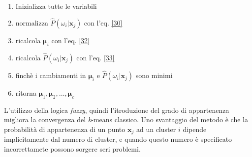 \begin{enumerate}
\item Inizializza tutte le variabili
\item normalizza $\hat{P}(\omega_i | \mathbf{x}_j)$ con l'eq. \ref{30}
\item ricalcola $\mathbf{\mu}_i$ con l'eq. \ref{32}
\item ricalcola $\hat{P}(\omega_i | \mathbf{x}_j)$ con l'eq. \ref{33}
\item finchè i cambiamenti in $\mathbf{\mu}_i$ e $\hat{P}(\omega_i | \mathbf{x}_j)$ sono minimi
\item ritorna $\mathbf{\mu}_1, \mathbf{\mu}_2, \dots, \mathbf{\mu}_c$
\end{enumerate}
L'utilizzo della logica \emph{fuzzy}, quindi l'itroduzione del grado di appartenenza migliora la convergenza del \emph{k}-means classico. Uno svantaggio del metodo è che la probabilità di appartenenza di un punto $\mathbf{x}_j$ ad un cluster $i$ dipende implicitamente dal numero di cluster, e quando questo numero è specificato incorrettamete possono sorgere seri problemi. 

